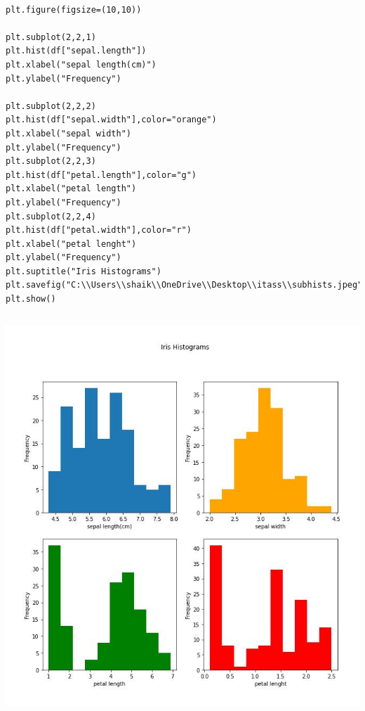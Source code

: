 \documentclass[12pt,a4paper]{article}
\begin{document}
    
\begin{verbatim}

plt.figure(figsize=(10,10))

plt.subplot(2,2,1)
plt.hist(df["sepal.length"])
plt.xlabel("sepal length(cm)")
plt.ylabel("Frequency")

plt.subplot(2,2,2)
plt.hist(df["sepal.width"],color="orange")
plt.xlabel("sepal width")
plt.ylabel("Frequency")
plt.subplot(2,2,3)
plt.hist(df["petal.length"],color="g")
plt.xlabel("petal length")
plt.ylabel("Frequency")
plt.subplot(2,2,4)
plt.hist(df["petal.width"],color="r")
plt.xlabel("petal lenght")
plt.ylabel("Frequency")
plt.suptitle("Iris Histograms")
plt.savefig("C:\\Users\\shaik\\OneDrive\\Desktop\\itass\\subhists.jpeg",bbox_inches="tight",pad_inches=0.5)
plt.show()
\end{verbatim}
\newpage
\includegraphics[width=15cm,height=15cm]{subhists.jpeg}
\
\pagestyle{fancy}
\end{document}
